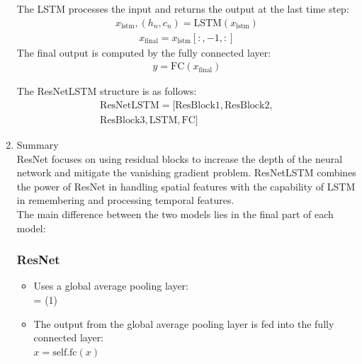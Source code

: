 \documentclass[conference]{IEEEtran}
\begin{document}
\begin{enumerate}
    The LSTM processes the input and returns the output at the last time step:
    \begin{align*}
      x_{\text{lstm}}, (h_n, c_n) = \text{LSTM}(x_{\text{lstm}})
    \end{align*}
    \begin{align*}
      x_{\text{final}} = x_{\text{lstm}}[:, -1, :]
    \end{align*}
    The final output is computed by the fully connected layer:    \begin{align*}
      y = \text{FC}(x_{\text{final}})
    \end{align*}

     
     The ResNetLSTM structure is as follows: 
     \begin{align*}
        \text{ResNetLSTM} = [\text{ResBlock1}, \text{ResBlock2},\\ \text{ResBlock3}, \text{LSTM}, \text{FC}]
    \end{align*}
  \item Summary \\
    ResNet focuses on using residual blocks to increase the depth of the neural network and mitigate the vanishing gradient problem. ResNetLSTM combines the power of ResNet in handling spatial features with the capability of LSTM in remembering and processing temporal features.\\
    The main difference between the two models lies in the final part of each model:
    \subsubsection{ResNet}
    \begin{itemize}
      \item Uses a global average pooling layer: \\
         = (1)
      \item The output from the global average pooling layer is fed into the fully connected layer: \\
        $x = \text{self.fc}(x)$
    \end{itemize}
    

\end{enumerate}
\end{document}
